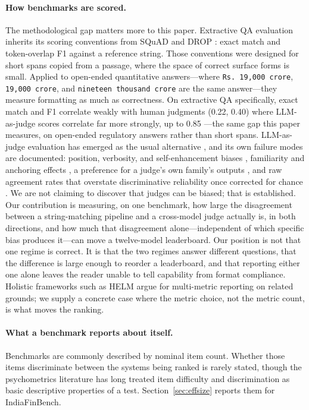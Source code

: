 \paragraph{How benchmarks are scored.}
The methodological gap matters more to this paper. Extractive QA evaluation inherits its scoring
conventions from SQuAD \citep{rajpurkar2016squad} and DROP \citep{dua2019drop}: exact match and
token-overlap F1 against a reference string. Those conventions were designed for short spans copied
from a passage, where the space of correct surface forms is small. Applied to open-ended
quantitative answers---where \texttt{Rs.\ 19,000 crore}, \texttt{19,000 crore}, and
\texttt{nineteen thousand crore} are the same answer---they measure formatting as much as
correctness. On extractive QA specifically, exact match and F1 correlate weakly with human judgments
(0.22, 0.40) where LLM-as-judge scores correlate far more strongly, up to 0.85
\citep{ho2025reassessing}---the same gap this paper measures, on open-ended regulatory answers rather
than short spans. LLM-as-judge evaluation has emerged as the usual alternative
\citep{zheng2023judging,gu2024survey}, and its own failure modes are documented: position, verbosity,
and self-enhancement biases \citep{zheng2023judging}, familiarity and anchoring effects
\citep{wang2024fairevaluators}, a preference for a judge's own family's outputs
\citep{wataoka2024selfpreference}, and raw agreement rates that overstate discriminative reliability
once corrected for chance \citep{norman2026reliability}. We are not claiming to discover that judges
can be biased; that is established. Our contribution is measuring, on one benchmark, how large the disagreement between a
string-matching pipeline and a cross-model judge actually is, in both directions, and how much that
disagreement alone---independent of which specific bias produces it---can move a twelve-model
leaderboard. Our position is not that one regime is correct. It is that the two regimes answer
different questions, that the difference is large enough to reorder a leaderboard, and that reporting
either one alone leaves the reader unable to tell capability from format compliance. Holistic
frameworks such as HELM \citep{liang2022helm} argue for multi-metric reporting on related grounds;
we supply a concrete case where the metric choice, not the metric count, is what moves the ranking.

\paragraph{What a benchmark reports about itself.}
Benchmarks are commonly described by nominal item count. Whether those items discriminate between
the systems being ranked is rarely stated, though the psychometrics literature has long treated item
difficulty and discrimination as basic descriptive properties of a test. Section~\ref{sec:effsize}
reports them for IndiaFinBench.
